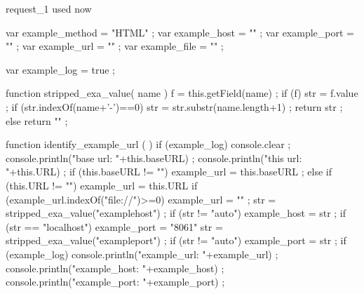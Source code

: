 

%

\startJSpreamble request_1 used now

    var example_method = "HTML" ;
    var example_host   = "" ;
    var example_port   = "" ;
    var example_url    = "" ;
    var example_file   = "" ;

    var example_log    = true ; %

    function stripped_exa_value( name ) {
        f = this.getField(name) ;
        if (f) {
            str = f.value ;
            if (str.indexOf(name+'-')==0) {
                str = str.substr(name.length+1) ;
            }
            return str ;
        } else {
            return "" ;
        }
    }

    function identify_example_url ( ) {
        if (example_log) {
            console.clear ;
            console.println("base url: "+this.baseURL) ;
            console.println("this url: "+this.URL) ;
        }
        if (this.baseURL != "") {
            example_url = this.baseURL ;
        } else {
            if (this.URL != "") {
                example_url = this.URL
            }
        }
        if (example_url.indexOf("file://")>=0) {
            example_url = "" ;
        }
        str = stripped_exa_value("examplehost") ;
        if (str != "auto") {
            example_host = str ;
            if (str == "localhost") {
                example_port = "8061"
            }
        }
        str = stripped_exa_value("exampleport") ;
        if (str != "auto") {
            example_port = str ;
        }
        if (example_log) {
            console.println("example_url: "+example_url) ;
            console.println("example_host: "+example_host) ;
            console.println("example_port: "+example_port) ;
        }
    }

